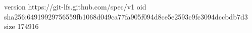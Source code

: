 version https://git-lfs.github.com/spec/v1
oid sha256:64919929756559fb1068d049ca77fa905f094d8ce5e2593c9fc3094dccbdb7d3
size 174916
